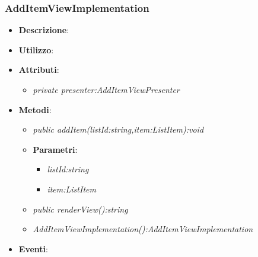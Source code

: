 \subsubsection{AddItemViewImplementation}
\begin{itemize}
\item \textbf{Descrizione}: 
\item \textbf{Utilizzo}:
\item \textbf{Attributi}: 
	\begin{itemize}
	\item \textit{private presenter:AddItemViewPresenter}\\
	
	\end{itemize}
\item \textbf{Metodi}:
	\begin{itemize}
	\item \textit{public addItem(listId:string,item:ListItem):void}\\

			\item{\textbf{Parametri}: \begin{itemize}
			\item \textit{listId:string}\\

			\item \textit{item:ListItem}\\

			\end{itemize}}
	\item \textit{public renderView():string}\\
	
	\item \textit{AddItemViewImplementation():AddItemViewImplementation}\\
	
	\end{itemize}
\item \textbf{Eventi}:
\end{itemize}

